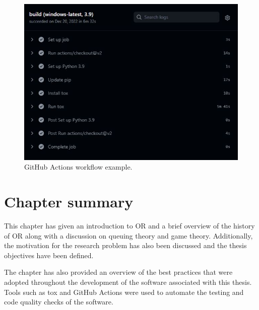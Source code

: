 \vspace{1cm}

\begin{figure}[H]
    \includegraphics[width=\linewidth]{chapters/01_introduction/Bin/github_actions.JPG}
    \caption{GitHub Actions workflow example.}
    \label{fig:github_actions}
\end{figure}

\newpage
\section{Chapter summary}

This chapter has given an introduction to OR and a brief overview of the
history of OR along with a discussion on queuing theory and game theory.
Additionally, the motivation for the research problem has also been discussed
and the thesis objectives have been defined.

The chapter has also provided an overview of the best practices that were
adopted throughout the development of the software associated with this thesis.
Tools such as tox and GitHub Actions were used to automate the testing
and code quality checks of the software.
